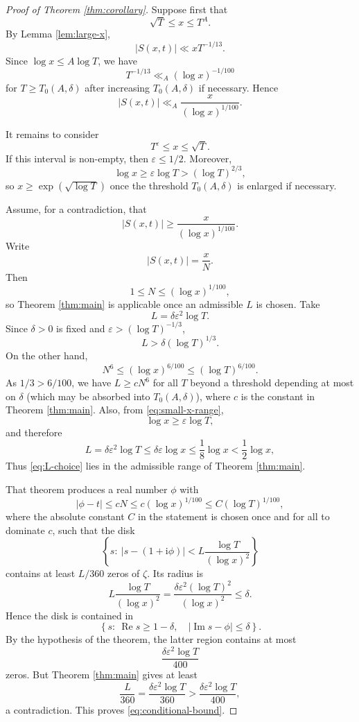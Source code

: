 \documentclass[12pt,reqno]{amsart}
\theoremstyle{remark}
\numberwithin{equation}{section}
\newcommand{\Ree}{\operatorname{Re}}
\newcommand{\Imm}{\operatorname{Im}}
\newcommand{\ii}{\mathrm i}
\begin{document}
\begin{proof}[Proof of Theorem \ref{thm:corollary}]
Suppose first that
\[
\sqrt T\le x\le T^A.
\]
By Lemma \ref{lem:large-x},
\[
|S(x,t)|\ll xT^{-1/13}.
\]
Since $\log x\le A\log T$, we have
\[
T^{-1/13}\ll_A (\log x)^{-1/100}
\]
for $T\ge T_0(A,\delta)$ after increasing $T_0(A,\delta)$ if necessary.  Hence
\[
|S(x,t)|\ll_A \frac{x}{(\log x)^{1/100}}.
\]

It remains to consider
\begin{equation}\label{eq:small-x-range}
T^\varepsilon\le x\le\sqrt T.
\end{equation}
If this interval is non-empty, then $\varepsilon\le1/2$.  Moreover,
\[
\log x\ge\varepsilon\log T>(\log T)^{2/3},
\]
so $x\ge\exp(\sqrt{\log T})$ once the threshold $T_0(A,\delta)$ is enlarged if necessary.

Assume, for a contradiction, that
\[
|S(x,t)|\ge\frac{x}{(\log x)^{1/100}}.
\]
Write
\[
|S(x,t)|=\frac{x}{N}.
\]
Then
\[
1\le N\le(\log x)^{1/100},
\]
so Theorem \ref{thm:main} is applicable once an admissible $L$ is chosen.  Take
\begin{equation}\label{eq:L-choice}
L=\delta\varepsilon^2\log T.
\end{equation}
Since $\delta>0$ is fixed and $\varepsilon>(\log T)^{-1/3}$,
\[
L>\delta(\log T)^{1/3}.
\]
On the other hand,
\[
N^6\le(\log x)^{6/100}\le(\log T)^{6/100}.
\]
As $1/3>6/100$, we have $L\ge cN^6$ for all $T$ beyond a threshold depending at most on $\delta$ (which may be absorbed into $T_0(A,\delta)$), where $c$ is the constant in Theorem \ref{thm:main}.  Also, from \eqref{eq:small-x-range},
\[
\log x\ge\varepsilon\log T,
\]
and therefore
\[
L=\delta\varepsilon^2\log T
\le\delta\varepsilon\log x
\le\frac18\log x<\frac12\log x,
\]
Thus \eqref{eq:L-choice} lies in the admissible range of Theorem \ref{thm:main}.

That theorem produces a real number $\phi$ with
\[
|\phi-t|\le cN
\le c(\log x)^{1/100}
\le C(\log T)^{1/100},
\]
where the absolute constant $C$ in the statement is chosen once and for all to dominate $c$, such that the disk
\[
\left\{s:\ |s-(1+\ii\phi)|<L\frac{\log T}{(\log x)^2}\right\}
\]
contains at least $L/360$ zeros of $\zeta$.  Its radius is
\[
L\frac{\log T}{(\log x)^2}
=
\frac{\delta\varepsilon^2(\log T)^2}{(\log x)^2}
\le\delta.
\]
Hence the disk is contained in
\[
\left\{s:\ \Ree s\ge1-\delta,\quad |\Imm s-\phi|\le\delta\right\}.
\]
By the hypothesis of the theorem, the latter region contains at most
\[
\frac{\delta\varepsilon^2\log T}{400}
\]
zeros.  But Theorem \ref{thm:main} gives at least
\[
\frac{L}{360}
=
\frac{\delta\varepsilon^2\log T}{360}
>
\frac{\delta\varepsilon^2\log T}{400},
\]
a contradiction.  This proves \eqref{eq:conditional-bound}.
\end{proof}
\end{document}
